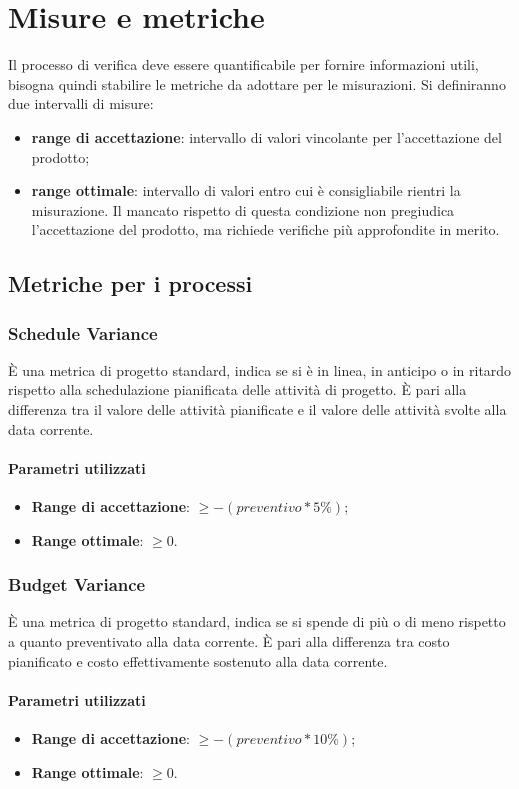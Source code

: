 \documentclass[../PianoDiQualifica.tex]{subfiles}
\begin{document}
\section{Misure e metriche}
Il processo di verifica deve essere quantificabile per fornire informazioni utili, bisogna quindi stabilire le metriche da adottare per le misurazioni. Si definiranno due intervalli di misure:
\begin{itemize}
	\item \textbf{range di accettazione}: intervallo di valori vincolante per l'accettazione del prodotto;
	\item \textbf{range ottimale}: intervallo di valori entro cui è consigliabile rientri la misurazione. Il mancato rispetto di questa condizione non pregiudica l'accettazione del prodotto, ma richiede verifiche più approfondite in merito.
\end{itemize}
\subsection{Metriche per i processi}
\subsubsection{Schedule Variance}
È una metrica di progetto standard, indica se si è in linea, in anticipo o in ritardo rispetto alla schedulazione pianificata delle attività di progetto. È pari alla differenza tra il valore delle attività pianificate e il valore delle attività svolte alla data corrente.
\paragraph{Parametri utilizzati}
\begin{itemize}
	\item \textbf{Range di accettazione}: $\geq -(preventivo*5\%)$;
	\item \textbf{Range ottimale}: $\geq 0$.
\end{itemize}
\subsubsection{Budget Variance}
È una metrica di progetto standard, indica se si spende di più o di meno rispetto a quanto preventivato alla data corrente. È pari alla differenza tra costo pianificato e costo effettivamente sostenuto alla data corrente.
\paragraph{Parametri utilizzati}
\begin{itemize}
	\item \textbf{Range di accettazione}: $\geq -(preventivo*10\%)$;
	\item \textbf{Range ottimale}: $\geq 0$.
\end{itemize}
\end{document}
